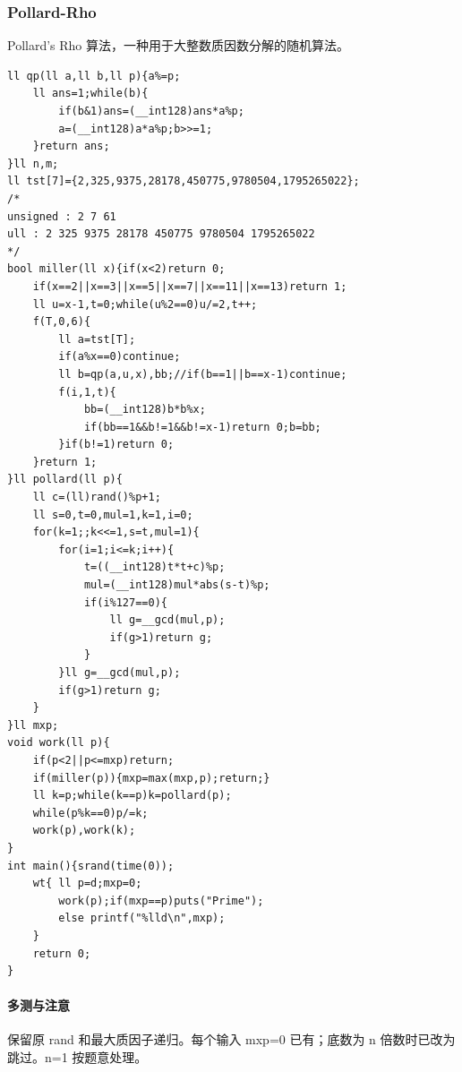 \subsubsection{Pollard-Rho}
Pollard's Rho 算法，一种用于大整数质因数分解的随机算法。
\begin{lstlisting}
ll qp(ll a,ll b,ll p){a%=p;
	ll ans=1;while(b){
		if(b&1)ans=(__int128)ans*a%p;
		a=(__int128)a*a%p;b>>=1;
	}return ans;
}ll n,m;
ll tst[7]={2,325,9375,28178,450775,9780504,1795265022};
/*
unsigned : 2 7 61
ull : 2 325 9375 28178 450775 9780504 1795265022
*/
bool miller(ll x){if(x<2)return 0;
    if(x==2||x==3||x==5||x==7||x==11||x==13)return 1;
	ll u=x-1,t=0;while(u%2==0)u/=2,t++;
	f(T,0,6){
		ll a=tst[T];
		if(a%x==0)continue;
		ll b=qp(a,u,x),bb;//if(b==1||b==x-1)continue;
		f(i,1,t){
			bb=(__int128)b*b%x;
			if(bb==1&&b!=1&&b!=x-1)return 0;b=bb;
		}if(b!=1)return 0;
	}return 1;
}ll pollard(ll p){
	ll c=(ll)rand()%p+1;
	ll s=0,t=0,mul=1,k=1,i=0;
	for(k=1;;k<<=1,s=t,mul=1){
		for(i=1;i<=k;i++){
			t=((__int128)t*t+c)%p;
			mul=(__int128)mul*abs(s-t)%p;
			if(i%127==0){
				ll g=__gcd(mul,p);
				if(g>1)return g;
			}
		}ll g=__gcd(mul,p);
		if(g>1)return g;
	}
}ll mxp;
void work(ll p){
	if(p<2||p<=mxp)return;
	if(miller(p)){mxp=max(mxp,p);return;}
	ll k=p;while(k==p)k=pollard(p);
	while(p%k==0)p/=k;
	work(p),work(k);
}
int main(){srand(time(0));
	wt{	ll p=d;mxp=0;
		work(p);if(mxp==p)puts("Prime");
		else printf("%lld\n",mxp);
	}
	return 0;
}
\end{lstlisting}

\paragraph{多测与注意} 保留原 rand 和最大质因子递归。每个输入 mxp=0 已有；底数为 n 倍数时已改为跳过。n=1 按题意处理。

